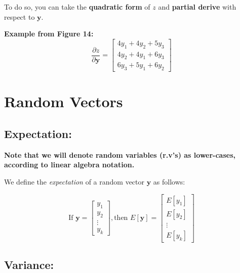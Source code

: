 \documentclass[12pt]{article}
\begin{document}
To do so, you can take the \textbf{quadratic form} of $z$ and \textbf{partial derive} with respect to $\mathbf{y}.$

\textbf{Example from Figure 14:}\\

\begin{equation}
    \frac{\partial z}{\partial\mathbf{y}} = \begin{bmatrix} 4y_1 + 4y_2 + 5y_3 \\ 4y_2 + 4y_1 + 6y_3 \\ 6y_3 + 5y_1 + 6y_2 \end{bmatrix}
\end{equation}

\section{Random Vectors}

\subsection{Expectation:}

\textbf{Note that we will denote random variables (r.v's) as lower-cases, according to linear algebra notation.}

We define the \textit{expectation} of a random vector $\mathbf{y}$ as follows:

\begin{equation}
    \textrm{If }\mathbf{y} = \begin{bmatrix} y_1 \\ y_2 \\ \vdots \\ y_k \end{bmatrix},\textrm{then } E[\mathbf{y}] = \begin{bmatrix} E[y_1] \\ E[y_2] \\ \vdots \\ E[y_k] \end{bmatrix}
\end{equation}


\subsection{Variance:}
\end{document}
